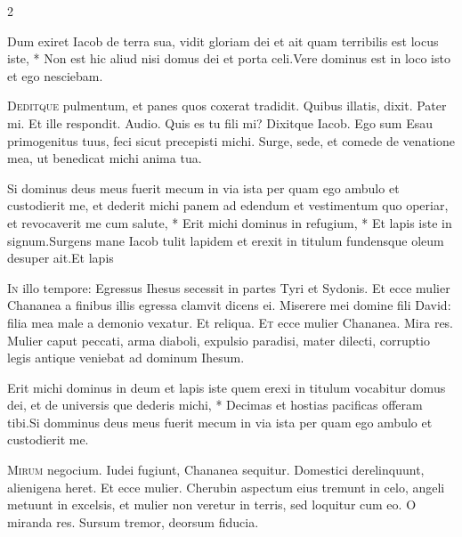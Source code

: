\begin{multicols*}{2}
\begin{responsory}
{Dum exiret Iacob de terra sua, vidit gloriam dei et ait quam terribilis est locus iste, * Non est hic aliud nisi domus dei et porta celi.}{Vere dominus est in loco isto et ego nesciebam.}
\end{responsory}%
\lettrine[lines=2]{\zallmancaps \color{Blue} D}{editque} pulmentum, et panes quos coxerat tradidit. Quibus illatis, dixit. Pater mi. Et ille respondit. Audio. Quis es tu fili mi? Dixitque Iacob. Ego sum Esau primogenitus tuus, feci sicut precepisti michi. Surge, sede, et comede de venatione mea, ut benedicat michi anima tua.
\begin{responsory-final}
{Si dominus deus meus fuerit mecum in via ista per quam ego ambulo et custodierit me, et dederit michi panem ad edendum et vestimentum quo operiar, et revocaverit me cum salute, * Erit michi dominus in refugium, * Et lapis iste in signum.}{Surgens mane Iacob tulit lapidem et erexit in titulum fundensque oleum desuper ait.}{Et lapis}
\end{responsory-final}%
\lettrine[lines=2]{\zallmancaps \color{Red} I}{n} illo tempore: Egressus Ihesus secessit in partes Tyri et Sydonis. Et ecce mulier Chananea a finibus illis egressa clamvit dicens ei. Miserere mei domine fili David: filia mea male a demonio vexatur. Et reliqua.
 \grecross
\lettrine[lines=2]{\zallmancaps \color{Blue} E}{t} ecce mulier Chananea. Mira res. Mulier caput peccati, arma diaboli, expulsio paradisi, mater dilecti, corruptio legis antique veniebat ad dominum Ihesum.
\begin{responsory}
{Erit michi dominus in deum et lapis iste quem erexi in titulum vocabitur domus dei, et de universis que dederis michi, * Decimas et hostias pacificas offeram tibi.}{Si domminus deus meus fuerit mecum in via ista per quam ego ambulo et custodierit me.}
\end{responsory}%
\lettrine[lines=2]{\zallmancaps \color{Red} M}{irum} negocium. Iudei fugiunt, Chananea sequitur. Domestici derelinquunt, alienigena heret. Et ecce mulier. Cherubin aspectum eius tremunt in celo, angeli metuunt in excelsis, et mulier non veretur in terris, sed loquitur cum eo. O miranda res. Sursum tremor, deorsum fiducia.

\end{multicols*}
